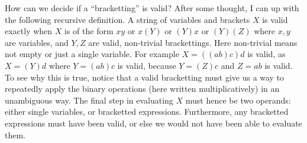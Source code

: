 \documentclass[twoside,a4paper,12pt]{article}
\theoremstyle{plain}
\theoremstyle{definition}
\begin{document}
How can we decide if a ``bracketting'' is valid?  After some thought, I can up with the following recursive definition.  A string of variables and brackets $X$ is valid exactly when $X$ is of the form $xy$ or $x(Y)$ or $(Y)x$ or $(Y)(Z)$ where $x,y$ are variables, and $Y,Z$ are valid, non-trivial brackettings.  Here non-trivial means not empty or just a single variable.  For example $X = ((ab)c)d$ is valid, as $X=(Y)d$ where $Y=(ab)c$ is valid, because $Y=(Z)c$ and $Z=ab$ is valid.  To see why this is true, notice that a valid bracketting must give us a way to repeatedly apply the binary operations (here written multiplicatively) in an unambiguous way.  The final step in evaluating $X$ must hence be two operands: either single variables, or bracketted expressions.  Furthermore, any bracketted expressions must have been valid, or else we would not have been able to evaluate them.
\end{document}
